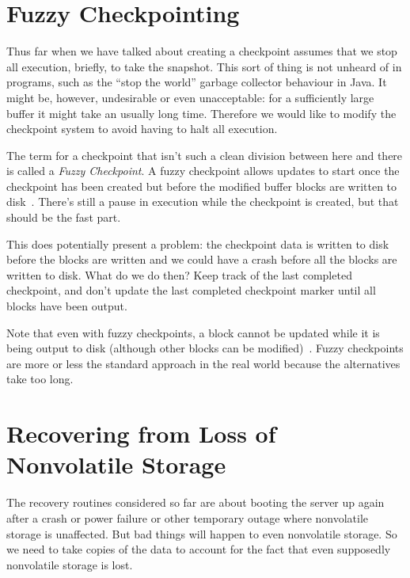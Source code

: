 




\section*{Fuzzy Checkpointing}

Thus far when we have talked about creating a checkpoint assumes that we stop all execution, briefly, to take the snapshot. This sort of thing is not unheard of in programs, such as the ``stop the world'' garbage collector behaviour in Java. It might be, however, undesirable or even unacceptable: for a sufficiently large buffer it might take an usually long time. Therefore we would like to modify the checkpoint system to avoid having to halt all execution.

The term for a checkpoint that isn't such a clean division between here and there is called a \textit{Fuzzy Checkpoint}. A fuzzy checkpoint allows updates to start once the checkpoint has been created but before the modified buffer blocks are written to disk~\cite{fds}. There's still a pause in execution while the checkpoint is created, but that should be the fast part.

This does potentially present a problem: the checkpoint data is written to disk before the blocks are written and we could have a crash before all the blocks are written to disk. What do we do then? Keep track of the last completed checkpoint, and don't update the last completed checkpoint marker until all blocks have been output.

Note that even with fuzzy checkpoints, a block cannot be updated while it is being output to disk (although other blocks can be modified)~\cite{dsc}. Fuzzy checkpoints are more or less the standard approach in the real world because the alternatives take too long.

\section*{Recovering from Loss of Nonvolatile Storage}

The recovery routines considered so far are about booting the server up again after a crash or power failure or other temporary outage where nonvolatile storage is unaffected. But bad things will happen to even nonvolatile storage. So we need to take copies of the data to account for the fact that even supposedly nonvolatile storage is lost.


